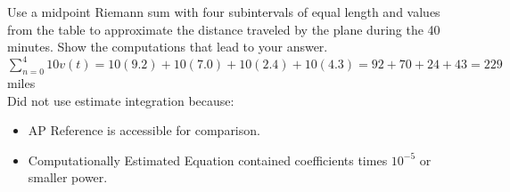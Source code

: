 \documentclass[10pt, letterpaper]{report}
\begin{document}
\begin{enumerate}
    Use a midpoint Riemann sum with four subintervals of equal length and values from the table to approximate the distance traveled by the plane during the 40 minutes. Show the computations that lead to your answer. \\

    $\sum_{n=0}^{4}10v(t)=
    10(9.2)+10(7.0)+10(2.4)+10(4.3)=
    92+70+24+43=229$ miles \\

    Did not use estimate integration because:
    \begin{itemize}
      \item{AP Reference is accessible for comparison.}
      \item{Computationally Estimated Equation contained coefficients times $10^{-5}$ or smaller power.}
    \end{itemize}
\end{enumerate}
\end{document}
